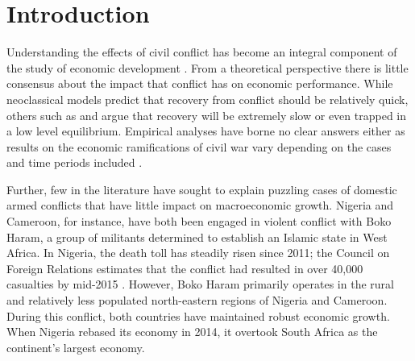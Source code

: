 
\section{Introduction}
\label{intro}

Understanding the effects of civil conflict has become an integral component of the study of economic development \citep{serneels:verpoorten:2013}. From a theoretical perspective there is little consensus about the impact that conflict has on economic performance. While neoclassical models predict that recovery from conflict should be relatively quick, others such as \citet{barro:martin:2004} and \citet{sachs:2006} argue that recovery will be extremely slow or even trapped in a low level equilibrium. Empirical analyses have borne no clear answers either as results on the economic ramifications of civil war vary depending on the cases and time periods included \citep{kang:meernik:2005}. 

Further, few in the literature have sought to explain puzzling cases of domestic armed conflicts that have little impact on macroeconomic growth. Nigeria and Cameroon, for instance, have both been engaged in violent conflict with Boko Haram, a group of militants determined to establish an Islamic state in West Africa. In Nigeria, the death toll has steadily risen since 2011; the Council on Foreign Relations estimates that the conflict had resulted in over 40,000 casualties by mid-2015 \citep{cfr:2015}. However, Boko Haram primarily operates in the rural and relatively less populated north-eastern regions of Nigeria and Cameroon. During this conflict, both countries have maintained robust economic growth. When Nigeria rebased its economy in 2014, it overtook South Africa as the continent's largest economy.



